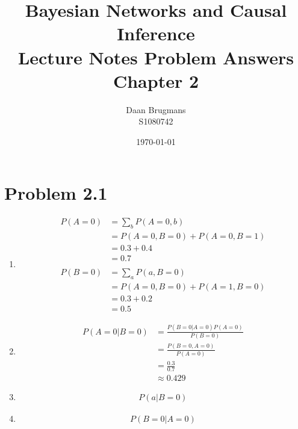 \documentclass[a4paper]{article}
\title{Bayesian Networks and Causal Inference \\ Lecture Notes Problem Answers \\ Chapter 2}
\author{Daan Brugmans \\ S1080742}
\date{\today}
\begin{document}
\maketitle
\section*{Problem 2.1}
\begin{enumerate}
    \item \begin{align*}
        P(A = 0) &= \sum_b P(A = 0, b) \\
        &= P(A = 0, B = 0) + P(A = 0, B = 1) \\
        &= 0.3 + 0.4 \\
        &= 0.7 \\
        \\
        P(B = 0) &= \sum_a P(a, B = 0) \\
        &= P(A = 0, B = 0) + P(A = 1, B = 0) \\
        &= 0.3 + 0.2 \\
        &= 0.5
    \end{align*}
    \item \begin{align*}
        P(A = 0 | B = 0) &= \frac{P(B = 0 | A = 0)P(A = 0)}{P(B = 0)} \\
        &= \frac{P(B = 0, A = 0)}{P(A = 0)} \\
        &= \frac{0.3}{0.7} \\
        &\approx 0.429
    \end{align*}
    \item \begin{align*}
        P(a | B = 0)
    \end{align*}
    \item \begin{align*}
        P(B = 0 | A = 0)
    \end{align*}
\end{enumerate}
\end{document}
